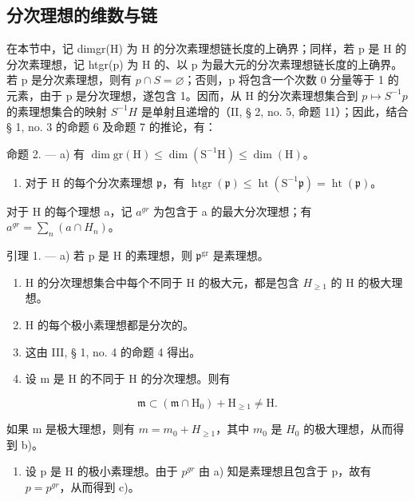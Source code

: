 \subsection{分次理想的维数与链}

在本节中，记 dimgr(H) 为 H 的分次素理想链长度的上确界；同样，若 p 是 H 的分次素理想，记 htgr(p) 为 H 的、以 p 为最大元的分次素理想链长度的上确界。若 p 是分次素理想，则有 \(p \cap S = \varnothing\)；否则，p 将包含一个次数 0 分量等于 1 的元素，由于 p 是分次理想，遂包含 1。因而，从 H 的分次素理想集合到 \(p \mapsto S^{-1}p\) 的素理想集合的映射 \(S^{-1}H\) 是单射且递增的（II, § 2, no. 5, 命题 11）；因此，结合 § 1, no. 3 的命题 6 及命题 7 的推论，有：

命题 2. --- a) 有 \(\dim \mathrm{gr}(\mathrm{H}) \leqslant \dim (\mathrm{S}^{-1}\mathrm{H}) \leqslant \dim (\mathrm{H})\)。

\begin{enumerate}
\def\labelenumi{\alph{enumi})}
\setcounter{enumi}{1}
\tightlist
\item
  对于 H 的每个分次素理想 \(\mathfrak{p}\)，有 \(\operatorname{htgr}(\mathfrak{p}) \leqslant \operatorname{ht}(\mathrm{S}^{-1}\mathfrak{p}) = \operatorname{ht}(\mathfrak{p})\)。
\end{enumerate}

对于 H 的每个理想 a，记 \(a^{gr}\) 为包含于 a 的最大分次理想；有 \(a^{gr} = \sum_{n} (a \cap H_n)\)。

引理 1. --- a) 若 p 是 H 的素理想，则 \(\mathfrak{p}^{\mathrm{gr}}\) 是素理想。

\begin{enumerate}
\def\labelenumi{\alph{enumi})}
\setcounter{enumi}{1}
\item
  H 的分次理想集合中每个不同于 H 的极大元，都是包含 \(H_{\geq1}\) 的 H 的极大理想。
\item
  H 的每个极小素理想都是分次的。
\item
  这由 III, § 1, no. 4 的命题 4 得出。
\item
  设 m 是 H 的不同于 H 的分次理想。则有
\end{enumerate}

\[
\mathfrak {m} \subset (\mathfrak {m} \cap \mathrm{H} _ {0}) + \mathrm{H} _ {\geqslant 1} \neq \mathrm{H}.
\]

如果 m 是极大理想，则有 \(m = m_{0} + H_{\geq 1}\)，其中 \(m_{0}\) 是 \(H_{0}\) 的极大理想，从而得到 b)。

\begin{enumerate}
\def\labelenumi{\alph{enumi})}
\setcounter{enumi}{2}
\tightlist
\item
  设 p 是 H 的极小素理想。由于 \(p^{gr}\) 由 a) 知是素理想且包含于 p，故有 \(p = p^{gr}\)，从而得到 c)。
\end{enumerate}

